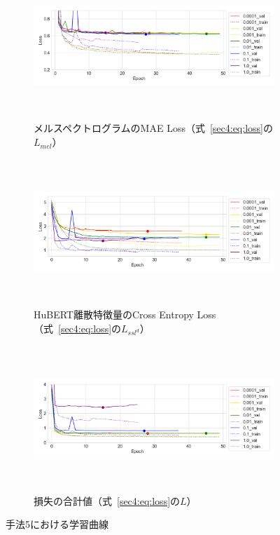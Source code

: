 \documentclass[12pt]{jarticle}
\numberwithin{equation}{section}    %
\numberwithin{figure}{section}      %
\numberwithin{table}{section}      %
\begin{document}
\begin{figure}[bt]
    \centering
    \begin{subfigure}{\linewidth}
        \centering
        \includegraphics[height=55mm]{./figure/sec4/learning_curves/5/mel_loss.png}
        \caption{メルスペクトログラムのMAE Loss（式~\eqref{sec4:eq:loss}の$L_{mel}$）}
        \label{sec4:fig:learning_curve_method_5_val_mel_loss}
    \end{subfigure}
    \begin{subfigure}{\linewidth}
        \centering
        \includegraphics[height=55mm]{./figure/sec4/learning_curves/5/ssl_feature_cluster_loss.png}
        \caption{HuBERT離散特徴量のCross Entropy Loss（式~\eqref{sec4:eq:loss}の$L_{ssl^{d}}$）}
        \label{sec4:fig:learning_curve_method_5_val_ssl_feature_cluster_loss}
    \end{subfigure}
    \begin{subfigure}{\linewidth}
        \centering
        \includegraphics[height=55mm]{./figure/sec4/learning_curves/5/total_loss.png}
        \caption{損失の合計値（式~\eqref{sec4:eq:loss}の$L$）}
        \label{sec4:fig:learning_curve_method_5_val_total_loss}
    \end{subfigure}
    \caption{手法5における学習曲線}
    \label{sec4:fig:learning_curve_method_5_val_losses}
\end{figure}
\end{document}
